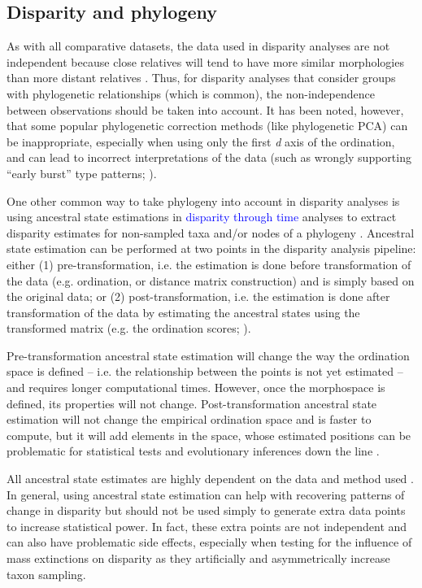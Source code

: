 \documentclass[12pt,letterpaper]{article}
\begin{document}
\subsection{Disparity and phylogeny} \label{section:phylo}

As with all comparative datasets, the data used in disparity analyses are not independent because close relatives will tend to have more similar morphologies than more distant relatives \citep{Harvey1998}.
Thus, for disparity analyses that consider groups with phylogenetic relationships (which is common), the non-independence between observations should be taken into account.
It has been noted, however, that some popular phylogenetic correction methods (like phylogenetic PCA) can be inappropriate, especially when using only the first \textit{d} axis of the ordination, and can lead to incorrect interpretations of the data (such as wrongly supporting ``early burst'' type patterns; \citealt{Uyeda2015}).

One other common way to take phylogeny into account in disparity analyses is using ancestral state estimations in \textcolor{blue}{disparity through time} analyses to extract disparity estimates for non-sampled taxa and/or nodes of a phylogeny \citep{brusatte2011phylogenetic}.
Ancestral state estimation can be performed at two points in the disparity analysis pipeline: either (1) pre-transformation, i.e. the estimation is done before transformation of the data (e.g. ordination, or distance matrix construction) and is simply based on the original data; or (2) post-transformation, i.e. the estimation is done after transformation of the data by estimating the ancestral states using the transformed matrix (e.g. the ordination scores; \citealt{lloyd2018}).

Pre-transformation ancestral state estimation will change the way the ordination space is defined -- i.e.
the relationship between the points is not yet estimated -- and requires longer computational times.
However, once the morphospace is defined, its properties will not change.
Post-transformation ancestral state estimation will not change the empirical ordination space and is faster to compute, but it will add elements in the space, whose estimated positions can be problematic for statistical tests and evolutionary inferences down the line \citep{lloyd2018}.

All ancestral state estimates are highly dependent on the data and method used \cite{Louca2019}.
In general, using ancestral state estimation can help with recovering patterns of change in disparity but should not be used simply to generate extra data points to increase statistical power.
In fact, these extra points are not independent and can also have problematic side effects, especially when testing for the influence of mass extinctions on disparity as they artificially and asymmetrically increase taxon sampling.
\end{document}
